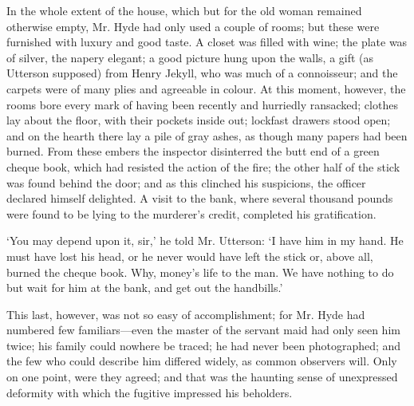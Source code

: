 \documentclass[]{novel}
\begin{document}
In the whole extent of the house, which but for the old woman remained otherwise empty, Mr. Hyde had only used a couple of rooms; but these were furnished with luxury and good taste. A closet was filled with wine; the plate was of silver, the napery elegant; a good picture hung upon the walls, a gift (as Utterson supposed) from Henry Jekyll, who was much of a connoisseur; and the carpets were of many plies and agreeable in colour. At this moment, however, the rooms bore every mark of having been recently and hurriedly ransacked; clothes lay about the floor, with their pockets inside out; lockfast drawers stood open; and on the hearth there lay a pile of gray ashes, as though many papers had been burned. From these embers the inspector disinterred the butt end of a green cheque book, which had resisted the action of the fire; the other half of the stick was found behind the door; and as this clinched his suspicions, the officer declared himself delighted. A visit to the bank, where several thousand pounds were found to be lying to the murderer’s credit, completed his gratification.

‘You may depend upon it, sir,’ he told Mr. Utterson: ‘I have him in my hand. He must have lost his head, or he never would have left the stick or, above all, burned the cheque book. Why, money’s life to the man. We have nothing to do but wait for him at the bank, and get out the handbills.’

This last, however, was not so easy of accomplishment; for Mr. Hyde had numbered few familiars—even the master of the servant maid had only seen him twice; his family could nowhere be traced; he had never been photographed; and the few who could describe him differed widely, as common observers will. Only on one point, were they agreed; and that was the haunting sense of unexpressed deformity with which the fugitive impressed his beholders.

\clearpage
\label{ch:05}
\begin{ChapterStart}
\vspace*{4\nbs}
\null\vspace{0.75\nbs}
\end{ChapterStart}
\end{document}
